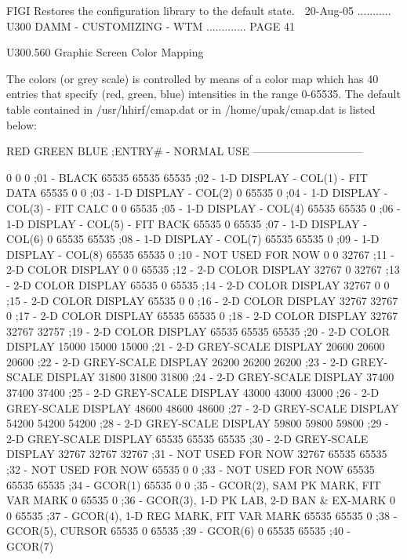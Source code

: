    FIGI   Restores the configuration library to the default state.
    
   20-Aug-05 ........... U300  DAMM - CUSTOMIZING - WTM ............. PAGE  41
 
   U300.560  Graphic Screen Color Mapping
 
   The  colors (or grey scale) is controlled by means of a color map which has
   40 entries that  specify  (red,  green,  blue)  intensities  in  the  range
   0-65535.  The  default  table  contained  in  /usr/hhirf/cmap.dat   or   in
   /home/upak/cmap.dat is listed below:
 
       RED  GREEN   BLUE   ;ENTRY# - NORMAL USE ------------------------------
 
         0      0      0  ;01 - BLACK
     65535  65535  65535  ;02 - 1-D DISPLAY - COL(1) - FIT DATA
     65535      0      0  ;03 - 1-D DISPLAY - COL(2)
         0  65535      0  ;04 - 1-D DISPLAY - COL(3) - FIT CALC
         0      0  65535  ;05 - 1-D DISPLAY - COL(4)
     65535  65535      0  ;06 - 1-D DISPLAY - COL(5) - FIT BACK
     65535      0  65535  ;07 - 1-D DISPLAY - COL(6)
         0  65535  65535  ;08 - 1-D DISPLAY - COL(7)
     65535  65535      0  ;09 - 1-D DISPLAY - COL(8)
     65535  65535      0  ;10 - NOT USED FOR NOW
         0      0  32767  ;11 - 2-D COLOR DISPLAY
         0      0  65535  ;12 - 2-D COLOR DISPLAY
     32767      0  32767  ;13 - 2-D COLOR DISPLAY
     65535      0  65535  ;14 - 2-D COLOR DISPLAY
     32767      0      0  ;15 - 2-D COLOR DISPLAY
     65535      0      0  ;16 - 2-D COLOR DISPLAY
     32767  32767      0  ;17 - 2-D COLOR DISPLAY
     65535  65535      0  ;18 - 2-D COLOR DISPLAY
     32767  32767  32757  ;19 - 2-D COLOR DISPLAY
     65535  65535  65535  ;20 - 2-D COLOR DISPLAY
     15000  15000  15000  ;21 - 2-D GREY-SCALE DISPLAY
     20600  20600  20600  ;22 - 2-D GREY-SCALE DISPLAY
     26200  26200  26200  ;23 - 2-D GREY-SCALE DISPLAY
     31800  31800  31800  ;24 - 2-D GREY-SCALE DISPLAY
     37400  37400  37400  ;25 - 2-D GREY-SCALE DISPLAY
     43000  43000  43000  ;26 - 2-D GREY-SCALE DISPLAY
     48600  48600  48600  ;27 - 2-D GREY-SCALE DISPLAY
     54200  54200  54200  ;28 - 2-D GREY-SCALE DISPLAY
     59800  59800  59800  ;29 - 2-D GREY-SCALE DISPLAY
     65535  65535  65535  ;30 - 2-D GREY-SCALE DISPLAY
     32767  32767  32767  ;31 - NOT USED FOR NOW
     32767  65535  65535  ;32 - NOT USED FOR NOW
     65535      0      0  ;33 - NOT USED FOR NOW
     65535  65535  65535  ;34 - GCOR(1)
     65535      0      0  ;35 - GCOR(2), SAM PK MARK,  FIT VAR MARK
         0  65535      0  ;36 - GCOR(3), 1-D PK LAB, 2-D BAN & EX-MARK
         0      0  65535  ;37 - GCOR(4), 1-D REG MARK, FIT VAR MARK
     65535  65535      0  ;38 - GCOR(5), CURSOR
     65535      0  65535  ;39 - GCOR(6)
         0  65535  65535  ;40 - GCOR(7)
 
